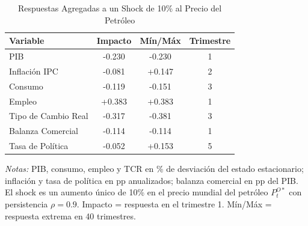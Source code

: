 \begin{table}[htbp]
\centering
\caption{Respuestas Agregadas a un Shock de 10\% al Precio del Petróleo}
\label{tab:oil_agg}
\begin{threeparttable}
\begin{tabular}{@{}l c c c@{}}
\toprule
Variable & Impacto & Mín/Máx & Trimestre \\
\midrule
PIB & -0.230 & -0.230 & 1 \\
Inflación IPC & -0.081 & +0.147 & 2 \\
Consumo & -0.119 & -0.151 & 3 \\
Empleo & +0.383 & +0.383 & 1 \\
Tipo de Cambio Real & -0.317 & -0.381 & 3 \\
Balanza Comercial & -0.114 & -0.114 & 1 \\
Tasa de Política & -0.052 & +0.153 & 5 \\
\bottomrule
\end{tabular}
\begin{tablenotes}[flushleft]
\footnotesize
\item \textit{Notas:} PIB, consumo, empleo y TCR en \% de desviación del estado estacionario; inflación y tasa de política en pp anualizados; balanza comercial en pp del PIB. El shock es un aumento único de 10\% en el precio mundial del petróleo $P^{O*}_t$ con persistencia $\rho = 0.9$. Impacto = respuesta en el trimestre 1. Mín/Máx = respuesta extrema en 40 trimestres.
\end{tablenotes}
\end{threeparttable}
\end{table}
